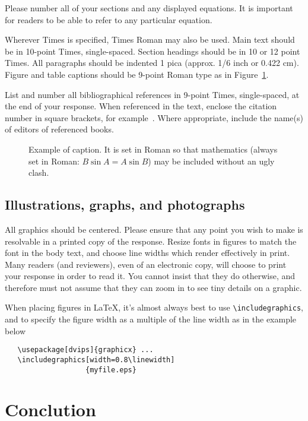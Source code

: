 \documentclass[rebuttal]{cvpr}
\begin{document}
Please number all of your sections and any displayed equations.  It is important
for readers to be able to refer to any particular equation.

Wherever Times is specified, Times Roman may also be used.  Main text should be
in 10-point Times, single-spaced. Section headings should be in 10 or 12 point
Times.  All paragraphs should be indented 1 pica (approx. 1/6 inch or 0.422
cm).  Figure and table captions should be 9-point Roman type as in
Figure~\ref{fig:onecol}.


List and number all bibliographical references in 9-point Times, single-spaced,
at the end of your response. When referenced in the text, enclose the citation
number in square brackets, for example~\cite{Authors14}.  Where appropriate,
include the name(s) of editors of referenced books.

\begin{figure}[t]
\begin{center}
\fbox{\rule{0pt}{1in} \rule{0.9\linewidth}{0pt}}
\end{center}
   \caption{Example of caption.  It is set in Roman so that mathematics
   (always set in Roman: $B \sin A = A \sin B$) may be included without an
   ugly clash.}
\label{fig:long}
\label{fig:onecol}
\end{figure}


\subsection{Illustrations, graphs, and photographs}

All graphics should be centered.  Please ensure that any point you wish to make is resolvable in a printed copy of the response.  Resize fonts in figures to match the font in the body text, and choose line widths which render effectively in print.  Many readers (and reviewers), even of an electronic copy, will choose to print your response in order to read it.  You cannot insist that they do otherwise, and therefore must not assume that they can zoom in to see tiny details on a graphic.

When placing figures in \LaTeX, it's almost always best to use \verb+\includegraphics+, and to specify the  figure width as a multiple of the line width as in the example below



{\small\begin{verbatim}
   \usepackage[dvips]{graphicx} ...
   \includegraphics[width=0.8\linewidth]
                   {myfile.eps}
\end{verbatim}
}

\section{Conclution}

{\small


}
\end{document}
